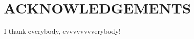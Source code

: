 %
\clearpage
\chapter*{ACKNOWLEDGEMENTS}
%
I thank everybody, evvvvvvvverybody!
%
\cleardoublepage
~


